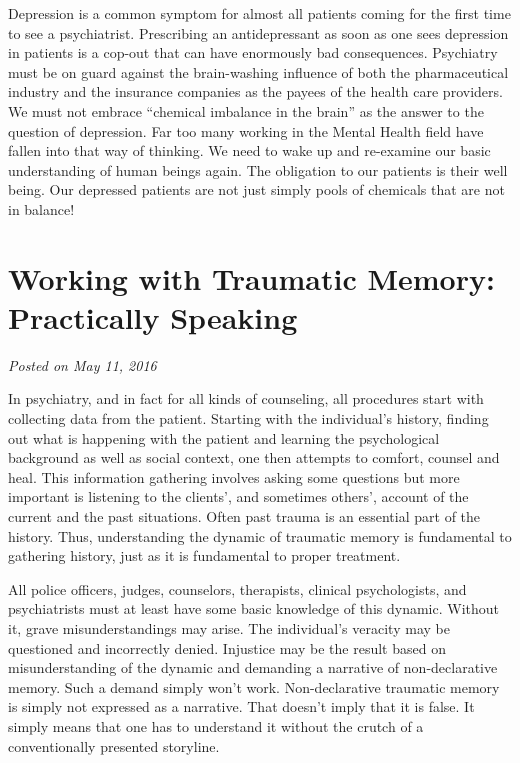 \documentclass[]{book}
\begin{document}
Depression is a common symptom for almost all patients coming for the first time to see a psychiatrist. Prescribing an antidepressant as soon as one sees depression in patients is a cop-out that can have enormously bad consequences. Psychiatry must be on guard against the brain-washing influence of both the pharmaceutical industry and the insurance companies as the payees of the health care providers. We must not embrace ``chemical imbalance in the brain'' as the answer to the question of depression. Far too many working in the Mental Health field have fallen into that way of thinking. We need to wake up and re-examine our basic understanding of human beings again. The obligation to our patients is their well being. Our depressed patients are not just simply pools of chemicals that are not in balance!

\hypertarget{working-with-traumatic-memory-practically-speaking}{%
\section{Working with Traumatic Memory: Practically Speaking}\label{working-with-traumatic-memory-practically-speaking}}

\emph{Posted on May 11, 2016}

In psychiatry, and in fact for all kinds of counseling, all procedures start with collecting data from the patient. Starting with the individual's history, finding out what is happening with the patient and learning the psychological background as well as social context, one then attempts to comfort, counsel and heal. This information gathering involves asking some questions but more important is listening to the clients', and sometimes others', account of the current and the past situations. Often past trauma is an essential part of the history. Thus, understanding the dynamic of traumatic memory is fundamental to gathering history, just as it is fundamental to proper treatment.

All police officers, judges, counselors, therapists, clinical psychologists, and psychiatrists must at least have some basic knowledge of this dynamic. Without it, grave misunderstandings may arise. The individual's veracity may be questioned and incorrectly denied. Injustice may be the result based on misunderstanding of the dynamic and demanding a narrative of non-declarative memory. Such a demand simply won't work. Non-declarative traumatic memory is simply not expressed as a narrative. That doesn't imply that it is false. It simply means that one has to understand it without the crutch of a conventionally presented storyline.
\end{document}
